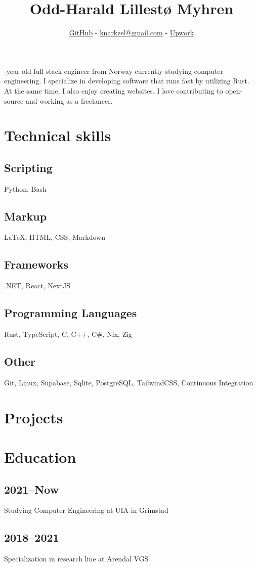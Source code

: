\documentclass[12pt]{article}
\renewcommand{\maketitle}{
  \begin{center}
    {\huge\bfseries\thetitle}
    
    \vspace{1em}
    
    \theauthor
  \end{center}
}
\begin{document}
\title{Odd-Harald Lillestø Myhren}
\author{\href{https://github.com/knarkzel}{GitHub} - \href{mailto:knarkzel@gmail.com}{knarkzel@gmail.com} - \href{https://www.upwork.com/freelancers/~01a292bc9be02825f6}{Upwork}}
\date{}

\maketitle

-year old full stack engineer from Norway currently studying computer engineering. I
specialize in developing software that runs fast by utilizing Rust. At the same time, I also
enjoy creating websites. I love contributing to open-source and working as a freelancer.

\section{Technical skills}

\subsection{Scripting}

Python, Bash

\subsection{Markup}

\LaTeX, HTML, CSS, Markdown

\subsection{Frameworks}

.NET, React, NextJS

\subsection{Programming Languages}

Rust, TypeScript, C, C++, C\#, Nix, Zig

\subsection{Other}

Git, Linux, Supabase, Sqlite, PostgreSQL, TailwindCSS, Continuous Integration

\section{Projects}

\section{Education}

\subsection{2021–Now}

Studying Computer Engineering at UIA in Grimstad

\subsection{2018–2021}

Specialization in research line at Arendal VGS
\end{document}
